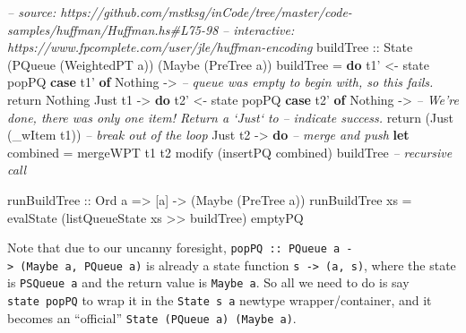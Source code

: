 \documentclass[]{article}
\newenvironment{Shaded}{}{}
\newcommand{\KeywordTok}[1]{\textcolor[rgb]{0.00,0.44,0.13}{\textbf{{#1}}}}
\newcommand{\DataTypeTok}[1]{\textcolor[rgb]{0.56,0.13,0.00}{{#1}}}
\newcommand{\CommentTok}[1]{\textcolor[rgb]{0.38,0.63,0.69}{\textit{{#1}}}}
\newcommand{\OtherTok}[1]{\textcolor[rgb]{0.00,0.44,0.13}{{#1}}}
\newcommand{\FunctionTok}[1]{\textcolor[rgb]{0.02,0.16,0.49}{{#1}}}
\newcommand{\NormalTok}[1]{{#1}}
\begin{document}
\begin{Shaded}
\begin{Highlighting}[]
\CommentTok{-- source: https://github.com/mstksg/inCode/tree/master/code-samples/huffman/Huffman.hs#L75-98}
\CommentTok{-- interactive: https://www.fpcomplete.com/user/jle/huffman-encoding}
\OtherTok{buildTree ::} \DataTypeTok{State} \NormalTok{(}\DataTypeTok{PQueue} \NormalTok{(}\DataTypeTok{WeightedPT} \NormalTok{a)) (}\DataTypeTok{Maybe} \NormalTok{(}\DataTypeTok{PreTree} \NormalTok{a))}
\NormalTok{buildTree }\FunctionTok{=} \KeywordTok{do}
    \NormalTok{t1' }\OtherTok{<-} \NormalTok{state popPQ}
    \KeywordTok{case} \NormalTok{t1' }\KeywordTok{of}
      \DataTypeTok{Nothing} \OtherTok{->}
        \CommentTok{-- queue was empty to begin with, so this fails.}
        \NormalTok{return }\DataTypeTok{Nothing}
      \DataTypeTok{Just} \NormalTok{t1 }\OtherTok{->} \KeywordTok{do}
        \NormalTok{t2' }\OtherTok{<-} \NormalTok{state popPQ}
        \KeywordTok{case} \NormalTok{t2' }\KeywordTok{of}
          \DataTypeTok{Nothing}  \OtherTok{->}
            \CommentTok{-- We're done, there was only one item!  Return a `Just` to}
            \CommentTok{-- indicate success.}
            \NormalTok{return (}\DataTypeTok{Just} \NormalTok{(_wItem t1))     }\CommentTok{-- break out of the loop}
          \DataTypeTok{Just} \NormalTok{t2 }\OtherTok{->} \KeywordTok{do}
            \CommentTok{-- merge and push}
            \KeywordTok{let} \NormalTok{combined }\FunctionTok{=} \NormalTok{mergeWPT t1 t2}
            \NormalTok{modify (insertPQ combined)}
            \NormalTok{buildTree                     }\CommentTok{-- recursive call}

\OtherTok{runBuildTree ::} \DataTypeTok{Ord} \NormalTok{a }\OtherTok{=>} \NormalTok{[a] }\OtherTok{->} \NormalTok{(}\DataTypeTok{Maybe} \NormalTok{(}\DataTypeTok{PreTree} \NormalTok{a))}
\NormalTok{runBuildTree xs }\FunctionTok{=} \NormalTok{evalState (listQueueState xs }\FunctionTok{>>} \NormalTok{buildTree) emptyPQ}
\end{Highlighting}
\end{Shaded}

Note that due to our uncanny foresight,
\texttt{popPQ\ ::\ PQueue\ a\ -\textgreater{}\ (Maybe\ a,\ PQueue\ a)}
is already a state function \texttt{s\ -\textgreater{}\ (a,\ s)}, where
the state is \texttt{PSQueue\ a} and the return value is
\texttt{Maybe\ a}. So all we need to do is say \texttt{state\ popPQ} to
wrap it in the \texttt{State\ s\ a} newtype wrapper/container, and it
becomes an ``official'' \texttt{State\ (PQueue\ a)\ (Maybe\ a)}.
\end{document}
